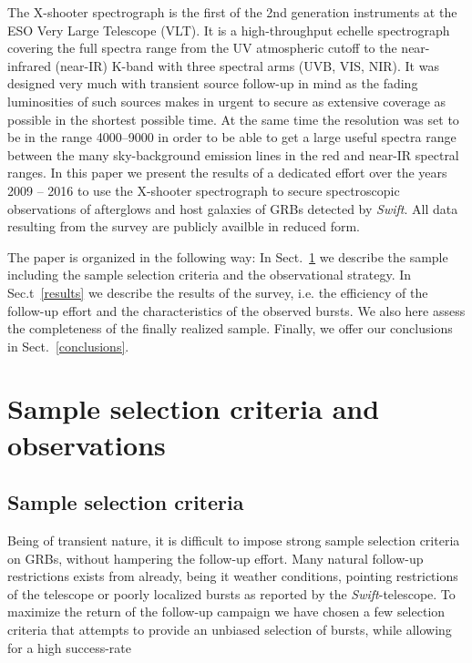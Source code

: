 \documentclass{aa}    %
\begin{document}
The X-shooter spectrograph \citep{Vernet2011} is the first of the 2nd
generation instruments at the ESO Very Large Telescope (VLT). It is a
high-throughput echelle spectrograph covering the full spectra range from the
UV atmospheric cutoff to the near-infrared (near-IR) K-band with three spectral
arms (UVB, VIS, NIR). It was designed very much with transient source follow-up
in mind as the fading luminosities of such sources makes in urgent to secure as
extensive coverage as possible in the shortest possible time. At the same time
the resolution was set to be in the range 4000--9000 in order to be able to get
a large useful spectra range between the many sky-background emission lines in
the red and near-IR spectral ranges. In this paper we present the results
of a dedicated effort over the years 2009 -- 2016 to use the X-shooter
spectrograph to secure spectroscopic observations of
afterglows and host galaxies of GRBs detected by {\it Swift}. 
All data resulting from the survey are publicly availble in reduced form.

The paper is organized in the following way: In Sect.~\ref{sample} we describe
the sample including the sample selection criteria and the observational
strategy.  In Sec.t~\ref{results} we describe the results of the survey, i.e.
the efficiency of the follow-up effort and the characteristics of the observed
bursts. We also here assess the completeness of the finally realized sample.
Finally, we offer our conclusions in Sect.~\ref{conclusions}.


\section{Sample selection criteria and observations}\label{sample}


\subsection{Sample selection criteria} \label{samplecrit}
Being of transient nature, it is difficult to impose strong sample selection
criteria on GRBs, without hampering the follow-up effort. Many natural follow-up
restrictions exists from already, being it weather conditions, pointing
restrictions of the telescope or poorly localized bursts as reported by the
\textit{Swift}-telescope. To maximize the return of the follow-up campaign
we have chosen a few selection criteria that attempts to provide an unbiased
selection of bursts, while allowing for a high success-rate 
\end{document}
